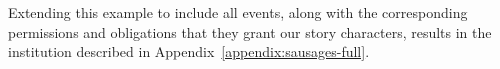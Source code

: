 \documentclass[11pt]{report}
\def\tropical{TropICAL}
\begin{document}
Extending this example to include all events, along with the corresponding
permissions and obligations that they grant our story characters, results in the
institution described in Appendix~\ref{appendix:sausages-full}.



\end{document}
